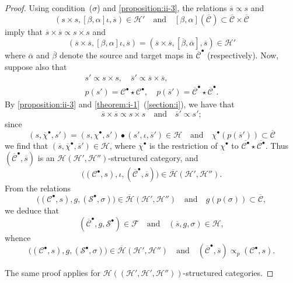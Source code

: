 \documentclass[a4paper,fleqn]{article}
\theoremstyle{plain}
\theoremstyle{definition}
\newcommand{\textand}{\quad\text{and}\quad}
\newcommand{\CC}{\mathcal{C}}
\newcommand{\HH}{\mathcal{H}}
\renewcommand{\SS}{\mathcal{S}}
\newcommand{\FF}{\mathcal{F}}
\newcommand{\subs}{\mathrel{\propto}}
\newcommand{\smallbullet}{\bullet}
\begin{document}
\begin{proof}
  Using condition~($\sigma$) and \cref{proposition:ii-3}, the relations $\overline{s}\subs s$ and
  \[
    (s\times s,[\beta,\alpha]\iota,\overline{s})\in\HH'
    \textand
    [\beta,\alpha](\overline{\CC})\subset\overline{\CC}\times\overline{\CC}
  \]
  imply that $\overline{s}\times\overline{s}\subs s\times s$ and
  \[
    (\overline{s}\times\overline{s},[\beta,\alpha]\iota,\overline{s})
    = (\overline{s}\times\overline{s},[\overline{\beta},\overline{\alpha}],\overline{s})
    \in\HH'
  \]
  where $\overline{\alpha}$ and $\overline{\beta}$ denote the source and target maps in $\overline{\CC}^\smallbullet$ (respectively).
  Now, suppose also that
  \[
    \begin{gathered}
      s'\subs s\times s,
      \quad
      \overline{s}'\subs\overline{s}\times\overline{s},
    \\p(s')=\CC^\smallbullet\star\CC^\smallbullet,
      \quad
      p(\overline{s}')=\overline{\CC}^\smallbullet\star\overline{\CC}^\smallbullet.
    \end{gathered}
  \]
  By \cref{proposition:ii-3} and \cref{theorem:i-1}~(\cref{section:i}), we have that
  \[
    \overline{s}\times\overline{s}\subs s\times s
    \textand
    \overline{s}'\subs s';
  \]
  since
  \[
    (s,\overline{\chi}^\smallbullet,s')
    = (s,\chi^\smallbullet,s')\smallbullet(s',\iota,\overline{s}')
    \in\HH
    \textand
    \chi^\smallbullet(p(\overline{s}'))
    \subset\overline{\CC}
  \]
  we find that $(\overline{s},\overline{\chi}^\smallbullet,\overline{s}')\in\HH$, where $\overline{\chi}^\smallbullet$ is the restriction of $\chi^\smallbullet$ to $\overline{\CC^\smallbullet}\star\overline{\CC^\smallbullet}$.
  Thus $(\overline{\CC}^\smallbullet,\overline{s})$ is an $\HH(\HH',\HH'')$-structured category, and
  \[
    \big(
      (\CC^\smallbullet,s),
      \iota,
      (\overline{\CC}^\smallbullet,\overline{s})
    \big)
    \in\overline{\HH}(\HH',\HH'').
  \]
  From the relations
  \[
    \big(
      (\CC^\smallbullet,s),
      g,
      (\SS^\smallbullet,\sigma)
    \big)
    \in\overline{\HH}(\HH',\HH'')
    \textand
    g(p(\sigma))
    \subset\overline{\CC},
  \]
  we deduce that
  \[
    (\overline{\CC}^\smallbullet,g,\SS^\smallbullet)\in\FF
    \textand
    (\overline{s},g,\sigma)\in\HH,
  \]
  whence
  \[
    \big(
      (\CC^\smallbullet,s),
      g,
      (\SS^\smallbullet,\sigma)
    \big)
    \in\overline{\HH}(\HH',\HH'')
    \textand
    (\overline{\CC}^\smallbullet,\overline{s})
    \subs_{\overline{p}} (\CC^\smallbullet,s).
  \]

  The same proof applies for $\HH((\HH',\HH',\HH''))$-structured categories.
\end{proof}
\end{document}
